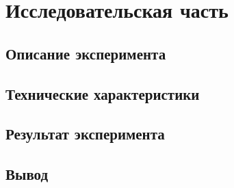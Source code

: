 \chapter{Исследовательская часть}

\section{Описание эксперимента}

\section{Технические характеристики}

\section{Результат эксперимента}

\section*{Вывод}

